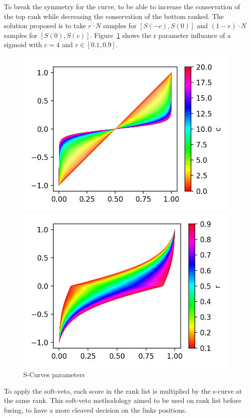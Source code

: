 To break the symmetry for the curve, to be able to increase the conservation of the top rank while decreasing the conservation of the bottom ranked.
The solution proposed is to take $r \cdot N$ samples for $\left[S(-c), S(0)\right]$ and $(1-r) \cdot N$ samples for $\left[S(0), S(c)\right]$.
Figure~\ref{fig:s_curve_r} shows the r parameter influance of a sigmoid with $c = 4$ and $r \in \left[0.1, 0.9\right]$.

\begin{figure}
  \centering
  \caption{S-Curves parameters}
  \label{fig:s_curve_params}

  \label{fig:s_curve_c}
  \includegraphics[width=\linewidth]{img/s_curve_c.png}

  \label{fig:s_curve_r}
  \includegraphics[width=\linewidth]{img/s_curve_r.png}
\end{figure}

To apply the soft-veto, each score in the rank list is multiplied by the s-curve at the same rank.
This soft-veto methodology aimed to be used on rank list before fusing, to have a more cleaved decision on the links positions.

